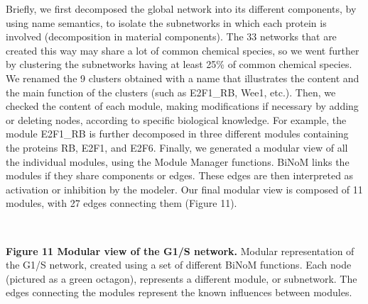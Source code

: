 \documentclass[11pt]{bmc_article_s50}
\newenvironment{bmcformat}{\begin{raggedright}\baselineskip20pt\sloppy\setboolean{publ}{false}}{\end{raggedright}\baselineskip20pt\sloppy}
\begin{document}
\begin{bmcformat}
Briefly, we first decomposed the global network into its different components,
by using name semantics, to isolate the subnetworks in which
each protein is involved (decomposition in material components). The 33 networks that are created this way may share a
lot of common chemical species, so we went further
by clustering the subnetworks having at least 25\% of common chemical species. We renamed
the 9 clusters obtained with a name that illustrates the content and the main
function of the clusters (such as E2F1\_RB, Wee1, etc.). Then, we checked the
content of each module, making modifications if necessary by adding or deleting nodes, according to specific biological knowledge.
For example, the module E2F1\_RB is
further decomposed in three different modules containing the proteins RB, E2F1,
and E2F6. Finally, we generated a modular view of all the individual modules, using the Module Manager functions.
BiNoM links the modules if they share components or edges. These edges are then
interpreted as activation or inhibition by the modeler. Our final
modular view is composed of 11 modules, with 27
edges connecting them (Figure 11).

\hrulefill\

\vspace*{-15pt}
\textbf{Figure 11 Modular view of the G1/S network.}
Modular representation of the G1/S network, created using a set of
different BiNoM functions. Each node (pictured as a green octagon), represents a
different module, or subnetwork. The edges connecting the modules represent the
 known influences between modules.
\vspace*{-21pt}

\hrulefill\




\end{bmcformat}
\end{document}
